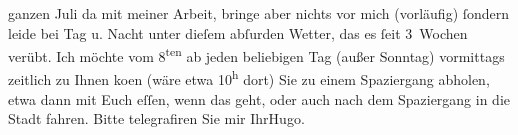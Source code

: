 \begin{ledgroupsized}[t]{13cm}
               ganzen Juli da mit {\pb}meiner Arbeit, bringe aber nichts vor mich (vorläufig) ſondern leide bei Tag u.
               Nacht unter dieſem abſurden Wetter, das es ſeit 3 Wochen verübt.\pend
           \pstart
           Ich möchte vom 8\textsuperscript{ten} ab jeden beliebigen Tag (außer Sonntag) vormittags zeitlich zu Ihnen ko{\geminationm}en (wäre etwa 10\textsuperscript{h} dort) Sie zu einem Spaziergang abholen, etwa dann mit Euch eſſen, wenn das
               geht, oder auch nach dem Spaziergang in die Stadt fahren. Bitte telegrafiren Sie mir
                  \label{T_L02345_1v}\label{T_L02345_1h}\pend
           \pstart Ihr\spacefill\mbox{Hugo.}\pend{}\endnumbering{}\end{ledgroupsized}  \newcommand{\dateiname}{L02345}\newcommand{\titel}{Hugo Hofmannsthal an Arthur Schnitzler, 2. 7. 1920}\newcommand{\editorInnen}{Martin Anton Müller und Gerd-Hermann Susen}
      